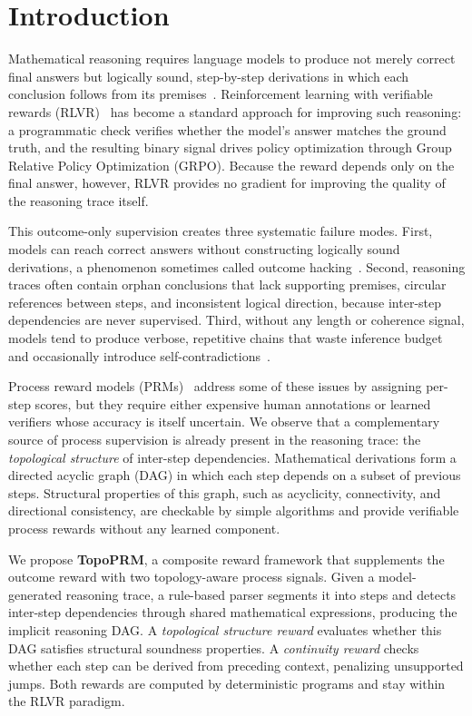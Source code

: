 \section{Introduction}
\label{sec:introduction}

Mathematical reasoning requires language models to produce not merely
correct final answers but logically sound, step-by-step derivations in
which each conclusion follows from its
premises~\citep{ElKishky2024OpenAIOS,Chen2025TowardsRE}. Reinforcement
learning with verifiable rewards
(RLVR)~\citep{deepseekr1,shao2024deepseekmath} has become a standard
approach for improving such reasoning: a programmatic check verifies
whether the model's answer matches the ground truth, and the resulting
binary signal drives policy optimization through Group Relative Policy
Optimization (GRPO). Because the reward depends only on the final answer,
however, RLVR provides no gradient for improving the quality of the
reasoning trace itself.

This outcome-only supervision creates three systematic failure modes.
First, models can reach correct answers without constructing logically
sound derivations, a phenomenon sometimes called outcome
hacking~\citep{Denison2024SycophancyTS}. Second, reasoning traces often
contain orphan conclusions that lack supporting premises, circular
references between steps, and inconsistent logical direction, because
inter-step dependencies are never supervised. Third, without any length
or coherence signal, models tend to produce verbose, repetitive chains
that waste inference budget and occasionally introduce
self-contradictions~\citep{reasoning_compression_2025}.

Process reward models (PRMs)~\citep{lightman2023lets,wang2024math}
address some of these issues by assigning per-step scores, but they
require either expensive human annotations or learned verifiers whose
accuracy is itself uncertain. We observe that a complementary source of
process supervision is already present in the reasoning trace: the
\emph{topological structure} of inter-step dependencies. Mathematical
derivations form a directed acyclic graph (DAG) in which each step
depends on a subset of previous steps. Structural properties of this
graph, such as acyclicity, connectivity, and directional consistency, are
checkable by simple algorithms and provide verifiable process rewards
without any learned component.

We propose \textbf{TopoPRM}, a composite reward framework that
supplements the outcome reward with two topology-aware process signals.
Given a model-generated reasoning trace, a rule-based parser segments it
into steps and detects inter-step dependencies through shared
mathematical expressions, producing the implicit reasoning DAG. A
\emph{topological structure reward} evaluates whether this DAG satisfies
structural soundness properties. A \emph{continuity reward} checks
whether each step can be derived from preceding context, penalizing
unsupported jumps. Both rewards are computed by deterministic programs
and stay within the RLVR paradigm.

